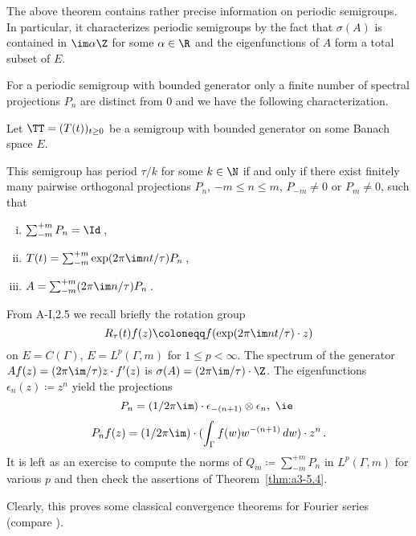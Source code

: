 The above theorem contains rather precise information on periodic semigroups.
In particular, it characterizes periodic semigroups by the fact that $\sigma(A)$ is contained in $\im\alpha\Z$ for some $\alpha \in \R$ and the eigenfunctions of $A$ form a total subset of $E$.


For a periodic semigroup with bounded generator
only a finite number of spectral projections $P_{n}$ are distinct from $0$ and we have the following characterization.
\begin{corollary}\label{cor:a3-5.5}
Let $\TT = (T(t))_{t \geq 0}$ be a semigroup with bounded generator on some Banach space $E$.

This semigroup has period $\tau/k$ for some $k \in \N$ if and only if there exist finitely many pairwise orthogonal projections $P_{n}$, $-m \leq n \leq m$, $P_{-m} \neq 0$ or $P_{m} \neq 0$, such that
\begin{enumerate}[(i)]
\item 
$\sum_{-m}^{+m} P_{n} =  \Id$\,,

\item 
$T(t) = \sum_{-m}^{+m} \exp(2\pi\im nt/\tau)P_{n}$\,,

\item 
$A = \sum_{-m}^{+m} (2\pi\im n/\tau)P_{n}$\,.

\end{enumerate}
\end{corollary}
\begin{example}\label{ex:a3-5.6}
From A-I,2.5 we recall briefly the rotation group
\[
R_{\tau}(t)f(z) \coloneqq f(\exp(2\pi\im nt/\tau) \cdot z)
\]
on $E = C(\Gamma)$, \resp $E = L^{p}(\Gamma,m)$ for $1 \leq p < \infty$.
The spectrum of the generator\quad
$Af(z) = (2\pi\im /\tau)z \cdot f'(z)$\quad
is \quad $\sigma(A) = (2\pi\im /\tau)\cdot\Z$.
The eigenfunctions $\epsilon_{n}(z) \coloneqq z^{n}$ yield the projections
\[
P_{n} = (1/2\pi\im )\cdot\epsilon_{-(n+1)} \otimes \epsilon_{n}, \text{ \ie }
\]
\[
P_{n}f(z) = (1/2\pi\im )\cdot(\int_{\Gamma} f(w)w^{-(n+1)} \, dw)\cdot z^{n}\,.
\]
It is left as an exercise to compute the norms of $Q_{m} \coloneqq \sum_{-m}^{+m} P_{n}$ in $L^{p}(\Gamma,m)$ for various $p$ and then check the assertions of Theorem~\ref{thm:a3-5.4}.

Clearly, this proves some classical convergence theorems for Fourier series (compare \citet[Chap.8.1]{davies:1980}).
\end{example}


